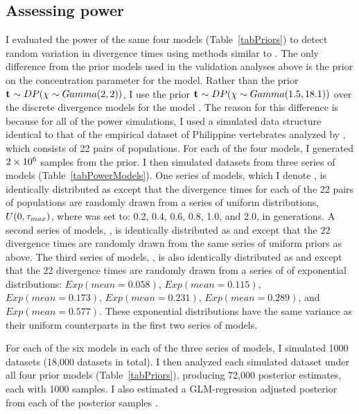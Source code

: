 \subsection{Assessing power}
I evaluated the power of the same four models (Table~\ref{tabPriors}) to
detect random variation in divergence times using methods similar to
\citet{Oaks2012}.
The only difference from the prior models used in the validation analyses above
is the prior on the concentration parameter \concentrationParam for the
\modelDPP model.
Rather than the prior
$\mathbf{t_{}} \sim DP(\chi \sim Gamma(2,2))$,
I use the prior
$\mathbf{t_{}} \sim DP(\chi \sim Gamma(1.5,18.1))$
over the discrete divergence models for the model \modelDPP.
The reason for this difference is because for all of the power simulations, I
used a simulated data structure identical to that of the empirical dataset of
Philippine vertebrates analyzed by \citet{Oaks2012}, which consists of 22 pairs
of populations.
For each of the four models, I generated $2\times 10^{6}$ samples from the prior.
I then simulated datasets from three series of models
(Table~\ref{tabPowerModels}).
One series of models, which I denote \powerSeriesOld, is identically
distributed as \modelOld except that the divergence times for each of the 22
pairs of populations are randomly drawn from a series of uniform distributions,
$U(0, \tau_{max})$, where  was set to: 0.2, 0.4, 0.6, 0.8, 1.0, and
2.0, in \globalcoalunit generations.
A second series of models, \powerSeriesUniform, is identically distributed as
\modelUniform and \modelDPP except that the 22 divergence times are randomly
drawn from the same series of uniform priors as above.
The third series of models, \powerSeriesExp, is also identically distributed as
\modelUniform and \modelDPP except that the 22 divergence times are randomly
drawn from a series of of exponential distributions:
$Exp(mean=0.058)$, $Exp(mean=0.115)$, $Exp(mean=0.173)$, $Exp(mean=0.231)$,
$Exp(mean=0.289)$, and $Exp(mean=0.577)$.
These exponential distributions have the same variance as their uniform
counterparts in the first two series of models.

For each of the six models in each of the three series of models, I simulated
1000 datasets (18,000 datasets in total).
I then analyzed each simulated dataset under all four prior models
(Table~\ref{tabPriors}), producing 72,000 posterior estimates, each with 1000
samples.
I also estimated a GLM-regression adjusted posterior from each of the
posterior samples \citep{Leuenberger2010}.

